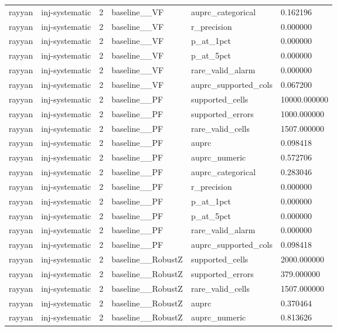 \begin{tabular}{llllll}
rayyan & inj-systematic & 2 & baseline\_\_VF & auprc\_categorical & 0.162196 \\
rayyan & inj-systematic & 2 & baseline\_\_VF & r\_precision & 0.000000 \\
rayyan & inj-systematic & 2 & baseline\_\_VF & p\_at\_1pct & 0.000000 \\
rayyan & inj-systematic & 2 & baseline\_\_VF & p\_at\_5pct & 0.000000 \\
rayyan & inj-systematic & 2 & baseline\_\_VF & rare\_valid\_alarm & 0.000000 \\
rayyan & inj-systematic & 2 & baseline\_\_VF & auprc\_supported\_cols & 0.067200 \\
rayyan & inj-systematic & 2 & baseline\_\_PF & supported\_cells & 10000.000000 \\
rayyan & inj-systematic & 2 & baseline\_\_PF & supported\_errors & 1000.000000 \\
rayyan & inj-systematic & 2 & baseline\_\_PF & rare\_valid\_cells & 1507.000000 \\
rayyan & inj-systematic & 2 & baseline\_\_PF & auprc & 0.098418 \\
rayyan & inj-systematic & 2 & baseline\_\_PF & auprc\_numeric & 0.572706 \\
rayyan & inj-systematic & 2 & baseline\_\_PF & auprc\_categorical & 0.283046 \\
rayyan & inj-systematic & 2 & baseline\_\_PF & r\_precision & 0.000000 \\
rayyan & inj-systematic & 2 & baseline\_\_PF & p\_at\_1pct & 0.000000 \\
rayyan & inj-systematic & 2 & baseline\_\_PF & p\_at\_5pct & 0.000000 \\
rayyan & inj-systematic & 2 & baseline\_\_PF & rare\_valid\_alarm & 0.000000 \\
rayyan & inj-systematic & 2 & baseline\_\_PF & auprc\_supported\_cols & 0.098418 \\
rayyan & inj-systematic & 2 & baseline\_\_RobustZ & supported\_cells & 2000.000000 \\
rayyan & inj-systematic & 2 & baseline\_\_RobustZ & supported\_errors & 379.000000 \\
rayyan & inj-systematic & 2 & baseline\_\_RobustZ & rare\_valid\_cells & 1507.000000 \\
rayyan & inj-systematic & 2 & baseline\_\_RobustZ & auprc & 0.370464 \\
rayyan & inj-systematic & 2 & baseline\_\_RobustZ & auprc\_numeric & 0.813626 \\

\end{tabular}
